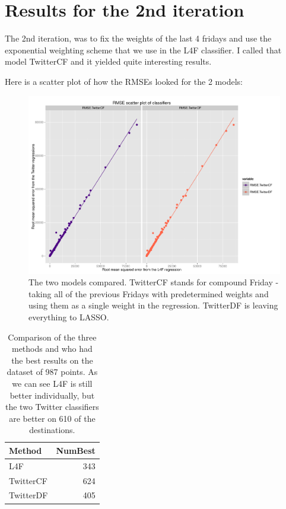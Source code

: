 \documentclass[minf,frontabs,twoside,singlespacing,parskip]{infthesis}
\begin{document}
\newpage
\section{Results for the 2nd iteration}

The 2nd iteration, was to fix the weights of the last 4 fridays and use the exponential weighting scheme that we use in the L4F classifier. I called that model TwitterCF and it yielded quite interesting results.

Here is a scatter plot of how the RMSEs looked for the 2 models:

\begin{figure}[h!]
\begin{center}
\includegraphics[scale=0.5]{rmse_scatter_by_reg}
\end{center}
\caption{The two models compared. TwitterCF stands for compound Friday - taking all of the previous Fridays with predetermined weights and using them as a single weight in the regression. TwitterDF is leaving everything to LASSO.}
\end{figure}

\begin{table}[]
\begin{center}
\begin{tabular}{ l | r }
Method & NumBest \\
\hline
L4F & 343 \\
TwitterCF & 624 \\
TwitterDF & 405 \\
\end{tabular}
\end{center}
\caption{Comparison of the three methods and who had the best results on the dataset of 987 points. As we can see L4F is still better individually, but the two Twitter classifiers are better on 610 of the destinations.}
\end{table}
\end{document}
